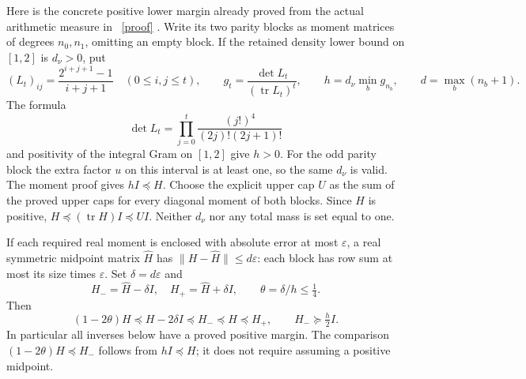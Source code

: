 \documentclass[11pt]{article}
\newcommand{\tr}{\operatorname{tr}}
\begin{document}
Here is the concrete positive lower margin already proved from the actual
arithmetic measure in \cite{precision}%
~\href{https://github.com/KokunoYumeto/zeta-function-research-reader/blob/5992ad50c0f2a06921f1fcaded7b4e38097c0739/workbenches/splitzero-tandem/continuations/20260920-original-kernel-mixed-determinants/providers/NATIVE_MOMENT_PRECISION.tex\#L1}{[proof]}%
{}. Write its two parity blocks as
moment matrices of degrees $n_0,n_1$, omitting an empty block. If the
retained density lower bound on $[1,2]$ is $d_\nu>0$, put
\[
 (L_t)_{ij}=\frac{2^{i+j+1}-1}{i+j+1}\quad(0\le i,j\le t),
 \qquad g_t=\frac{\det L_t}{(\tr L_t)^t},\qquad
 h=d_\nu\min_{b}g_{n_b},\qquad d=\max_b(n_b+1).              \tag{MC2}
\]
The formula
\[
 \det L_t=\prod_{j=0}^t\frac{(j!)^4}{(2j)!(2j+1)!}
\]
and positivity of the integral Gram on $[1,2]$ give $h>0$.
For the odd parity block the extra factor $u$ on this interval is at
least one, so the same $d_\nu$ is valid. The moment proof gives
$hI\preceq H$. Choose the explicit upper cap $U$ as the sum of
the proved upper caps for every diagonal moment of both blocks. Since
$H$ is positive, $H\preceq(\tr H)I\preceq UI$.
Neither $d_\nu$ nor any total mass is set equal to one.

If each required real moment is enclosed with absolute error at most
$\varepsilon$, a real symmetric midpoint matrix $\widehat H$ has
$\|H-\widehat H\|\le d\varepsilon$: each block has row sum at most
its size times $\varepsilon$. Set $\delta=d\varepsilon$ and
\[
 H_-=\widehat H-\delta I,\quad H_+=\widehat H+\delta I,
 \qquad \theta=\delta/h\le\tfrac14.
                                                               \tag{MC3}
\]
Then
\[
 (1-2\theta)H\preceq H-2\delta I\preceq H_-
 \preceq H\preceq H_+,
 \qquad H_-\succeq\tfrac h2 I.                                \tag{MC4}
\]
In particular all inverses below have a proved positive margin. The
comparison $(1-2\theta)H\preceq H_-$ follows from $hI\preceq H$;
it does not require assuming a positive midpoint.
\end{document}
